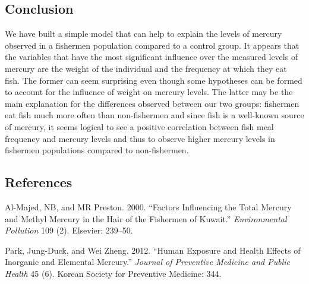\documentclass[12pt,]{article}
\begin{document}
\subsection{Conclusion}\label{conclusion}

We have built a simple model that can help to explain the levels of
mercury observed in a fishermen population compared to a control group.
It appears that the variables that have the most significant influence
over the measured levels of mercury are the weight of the individual and
the frequency at which they eat fish. The former can seem surprising
even though some hypotheses can be formed to account for the influence
of weight on mercury levels. The latter may be the main explanation for
the differences observed between our two groups: fishermen eat fish much
more often than non-fishermen and since fish is a well-known source of
mercury, it seems logical to see a positive correlation between fish
meal frequency and mercury levels and thus to observe higher mercury
levels in fishermen populations compared to non-fishermen.

\subsection*{References}\label{references}

\hypertarget{refs}{}
\hypertarget{ref-al2000factors}{}
Al-Majed, NB, and MR Preston. 2000. ``Factors Influencing the Total
Mercury and Methyl Mercury in the Hair of the Fishermen of Kuwait.''
\emph{Environmental Pollution} 109 (2). Elsevier: 239--50.

\hypertarget{ref-park2012human}{}
Park, Jung-Duck, and Wei Zheng. 2012. ``Human Exposure and Health
Effects of Inorganic and Elemental Mercury.'' \emph{Journal of
Preventive Medicine and Public Health} 45 (6). Korean Society for
Preventive Medicine: 344.
\end{document}
